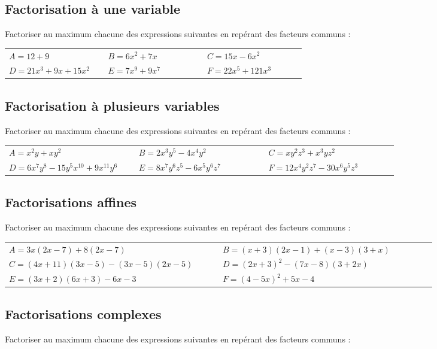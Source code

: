 \documentclass[oneside,12pt]{article}          %
\begin{document}
\subsection{Factorisation à une variable}
Factoriser au maximum chacune des expressions suivantes en repérant des facteurs communs :

\begin{tabular}{p{0.3\linewidth} p{0.3\linewidth} p{0.3\linewidth}}
	$A=12+9$ & $B=6x^2+7x$ & $C=15x-6x^2$ \\
	$D=21x^3+9x+15x^2$ & $E=7x^9+9x^7$ & $F=22x^5+121x^3$
\end{tabular}



\subsection{Factorisation à plusieurs variables}
Factoriser au maximum chacune des expressions suivantes en repérant des facteurs communs :

\begin{tabular}{p{0.3\linewidth} p{0.3\linewidth} p{0.3\linewidth}}
	$A=x^2y+xy^2$ & $B=2x^3y^5-4x^4y^2$ & $C=xy^2z^3+x^3yz^2$ \\
	$D=6x^7y^8-15y^5x^{10}+9x^{11}y^6$ & $E=8x^7y^6z^5-6x^5y^6z^7$ & $F=12x^4y^2z^7-30x^6y^5z^3$
\end{tabular}



\subsection{Factorisations affines}
Factoriser au maximum chacune des expressions suivantes en repérant des facteurs communs :

\begin{tabular}{p{0.45\linewidth} p{0.45\linewidth}}
	$A=3x(2x-7)+8(2x-7)$ & $B=(x+3)(2x-1)+(x-3)(3+x)$ \\
	$C=(4x+11)(3x-5)-(3x-5)(2x-5)$ & $D=(2x+3)^2-(7x-8)(3+2x)$ \\
	$E=(3x+2)(6x+3)-6x-3$ & $F=(4-5x)^2+5x-4$
\end{tabular}



\subsection{Factorisations complexes}
Factoriser au maximum chacune des expressions suivantes en repérant des facteurs communs :
\end{document}
